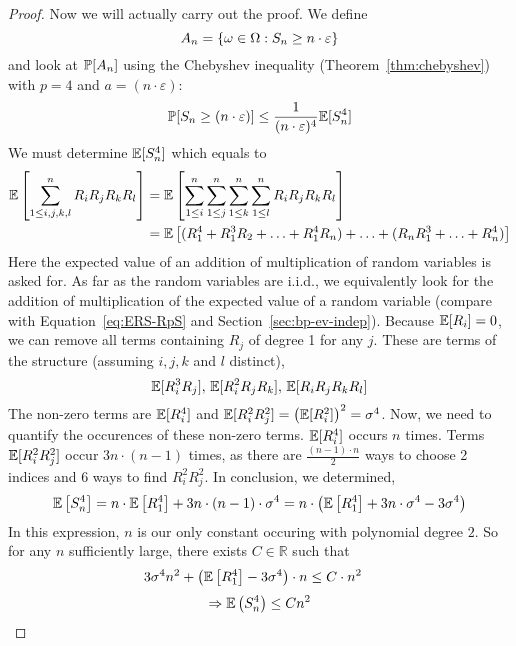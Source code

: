 \begin{proof}
  Now we will actually carry out the proof. We define
  \[ A_n = \left\{\omega \in \Omega: S_n \geq n \cdot \varepsilon\right\} \]
  and look at $\mathbb P[A_n]$ using the Chebyshev inequality (Theorem~\ref{thm:chebyshev}) with $p=4$ and $a=(n\cdot\varepsilon)$:
  \[ \mathbb P[S_n \geq (n\cdot\varepsilon)] \leq \frac{1}{(n\cdot\varepsilon)^4} \mathbb E[S_n^4] \]
  We must determine $\mathbb E[S_n^4]$ which equals to
  \begin{align*}
    \mathbb E\left[\sum_{1 \leq i,j,k,l}^n R_i R_j R_k R_l\right]
      &= \mathbb E\left[\sum_{1\leq i}^n \sum_{1\leq j}^n \sum_{1\leq k}^n \sum_{1\leq l}^n R_i R_j R_k R_l\right] \notag\\
      &= \mathbb E\left[(R_1^4 + R_1^3 R_2 + \ldots + R_1^4 R_n) + \ldots + (R_n R_1^3 + \ldots + R_n^4)\right]
  \end{align*}
  Here the expected value of an addition of multiplication of random variables is asked for.
  As far as the random variables are i.i.d.,
  we equivalently look for the addition of multiplication of the expected value of a random variable
  (compare with Equation~\ref{eq:ERS-RpS} and Section~\ref{sec:bp-ev-indep}).
  Because $\mathbb E[R_i] = 0$, we can remove all terms containing $R_j$ of degree 1 for any $j$.
  These are terms of the structure (assuming $i, j, k$ and $l$ distinct),
  \[
    \mathbb E[R_i^3 R_j], \,
    \mathbb E[R_i^2 R_j R_k], \,
    \mathbb E[R_i R_j R_k R_l]
  \]
  The non-zero terms are $\mathbb E[R_i^4]$ and $\mathbb E[R_i^2 R_j^2] = \left(\mathbb E[R_i^2]\right)^2 = \sigma^4$.
  Now, we need to quantify the occurences of these non-zero terms.
  $\mathbb E[R_i^4]$ occurs $n$ times.
  Terms $\mathbb E[R_i^2 R_j^2]$ occur $3n \cdot (n-1)$ times,
    as there are $\frac{(n-1) \cdot n}{2}$ ways to choose 2 indices
    and 6 ways to find $R_i^2 R_j^2$.
  In conclusion, we determined,
  \[
    \mathbb E\left[S_n^4\right]
      = n \cdot \mathbb E\left[R_1^4\right] + 3n \cdot (n - 1) \cdot \sigma^4
      = n \cdot \left( \mathbb E\left[R_1^4\right] + 3n \cdot \sigma^4 - 3 \sigma^4 \right)
  \]
  In this expression, $n$ is our only constant occuring with polynomial degree $2$. So for any $n$ sufficiently large, there exists $C \in \mathbb R$ such that
  \begin{align}
    3 \sigma^4 n^2 + \left(\mathbb E\left[R_1^4\right] - 3 \sigma^4\right) \cdot n &\leq C \cdot n^2 \label{eq:3sigman2}
  \end{align}
  \[ \Rightarrow \mathbb E\left(S_n^4\right) \leq C n^2 \]


\end{proof}
